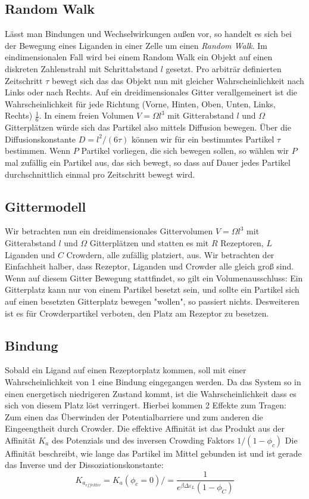 \documentclass[bachelor,       %
               twoside,        %
               BCOR10mm,       %
               english,ngerman, %
               ]{GAUBM}
\begin{document}
\subsection{Random Walk}
Lässt man Bindungen und Wechselwirkungen außen vor, so handelt es sich bei der
Bewegung eines Liganden in einer Zelle um einen \emph{Random Walk}.
Im eindimensionalen Fall wird bei einem Random Walk ein Objekt auf
einen diskreten Zahlenstrahl mit Schrittabstand $l$ gesetzt.
Pro arbiträr definierten Zeitschritt $\tau$ bewegt sich das das Objekt nun mit gleicher Wahrscheinlichkeit
nach Links oder nach Rechts. Auf ein dreidimensionales Gitter verallgemeinert ist die Wahrscheinlichkeit
für jede Richtung (Vorne, Hinten, Oben, Unten, Links, Rechts) $\frac{1}{6}$.
In einem freien Volumen $V = \Omega l^3$ mit Gitterabstand $l$ und $\Omega$ Gitterplätzen
würde sich das Partikel also mittels Diffusion bewegen. Über die Diffusionskonstante $D = l^2 / (6\tau)$
können wir für ein bestimmtes Partikel $\tau$ bestimmen.
Wenn $P$ Partikel vorliegen, die sich bewegen sollen, so wählen wir $P$ mal zufällig ein Partikel aus,
das sich bewegt, so dass auf Dauer jedes Partikel durchschnittlich einmal pro Zeitschritt bewegt wird.

\subsection{Gittermodell}
Wir betrachten nun ein dreidimensionales Gittervolumen
$V = \Omega l^3$ mit Gitterabstand $l$ und $\Omega$ Gitterplätzen und statten es mit
$R$ Rezeptoren, $L$ Liganden und $C$ Crowdern, alle zufällig platziert, aus.
Wir betrachten der Einfachheit halber, dass Rezeptor, Liganden und Crowder alle gleich groß sind.
Wenn auf diesem Gitter Bewegung stattfindet, so gilt ein Volumenausschluss: Ein Gitterplatz kann nur
von einem Partikel besetzt sein, und sollte ein Partikel sich auf einen besetzten Gitterplatz bewegen
"wollen", so passiert nichts. Desweiteren ist es für Crowderpartikel verboten, den Platz am Rezeptor zu
besetzen.
\subsection{Bindung}
Sobald ein Ligand auf einen Rezeptorplatz kommen, soll mit einer Wahrscheinlichkeit von
1 eine Bindung eingegangen werden. Da das System so in einen energetisch niedrigeren
Zustand kommt, ist die Wahrscheinlichkeit dass es sich von diesem Platz löst verringert.
Hierbei kommen 2 Effekte zum Tragen: Zum einen das Überwinden der Potentialbarriere und zum anderen
die Eingeengtheit durch Crowder. Die effektive Affinität ist das Produkt aus der Affinität $K_a$ des Potenzials und
des inversen Crowding Faktors $1/(1-\phi_c)$
Die Affinität beschreibt, wie lange das Partikel im
Mittel gebunden ist und ist gerade das Inverse und der Dissoziationskonstante:
\begin{equation}
K_{a_{effektiv}} = K_a(\phi_c = 0) / =\frac{1}{e^{\beta\Delta\varepsilon_L}(1-\phi_C)}
\end{equation}
\end{document}
